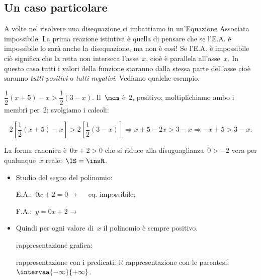 \subsection{Un caso particolare}

A volte nel risolvere una disequazione ci imbattiamo in un'Equazione 
Associata impossibile. 
La prima reazione istintiva è quella di pensare che se l'E.A. è 
impossibile lo sarà anche la disequazione, ma non è così! 
Se l'E.A. è impossibile ciò significa che la retta non interseca l'asse~\(x\), 
cioè è parallela all'asse~\(x\). In questo caso tutti i valori della funzione 
staranno dalla stessa parte dell'asse cioè saranno \emph{tutti positivi} o 
\emph{tutti negativi}. 
Vediamo qualche esempio.


\begin{esempio}
\(\dfrac{1}{2} (x+5)-x>\dfrac{1}{2} (3-x).\)
Il~\(\mcm\) è~2, positivo; moltiplichiamo ambo i membri per~2; svolgiamo
i calcoli:

\[2 \left[\frac{1}{2}(x+5)-x\right]>2
\left[\frac{1}{2}(3-x)\right]\Rightarrow x+5-2x>3-x\Rightarrow -x+5>3-x.\]

La forma canonica è~\(0 x + 2 > 0\) che si riduce alla disuguaglianza~\(0>-2\)
vera per qualunque~\(x\) reale:~\(\IS=\insR\).
\begin{itemize} [noitemsep]
 \item Studio del segno del polinomio:\\
 \begin{minipage}{.45\textwidth}
  E.A.:~\(0 x + 2 = 0  \rightarrow \quad \) eq. impossibile;
 \end{minipage}
 \begin{minipage}{.25\textwidth}
  F.A.:~\(y=0 x + 2 \rightarrow \)
 \end{minipage}
 \begin{minipage}{.3\textwidth}
  \segnipos
 \end{minipage}
 \item Quindi per ogni valore di~\(x\) il polinomio è sempre positivo. 
 \subitem 
  \begin{minipage}{.35\textwidth}
   rappresentazione grafica: 
  \end{minipage}
  \begin{minipage}{.30\textwidth}
  \end{minipage}
 \subitem rappresentazione con i predicati: \quad \(\mathbb{R}\) 
 \subitem rappresentazione con le parentesi: 
\quad \(\intervaa{-\infty}{+\infty}\). 
\end{itemize}
\end{esempio}


